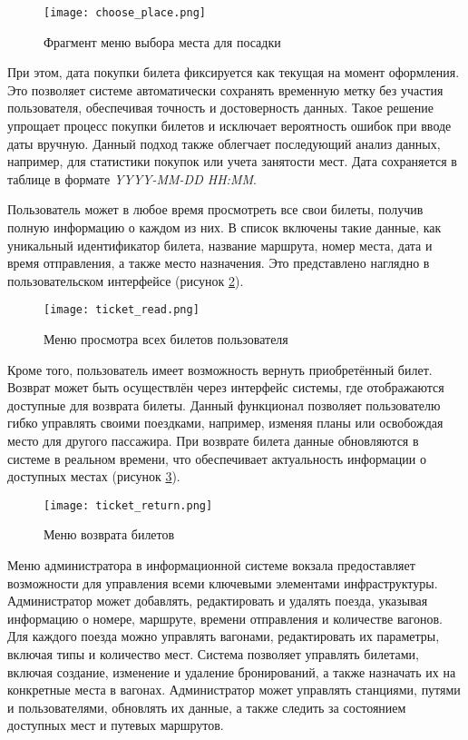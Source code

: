 \begin{figure}[h]
    \centering
    \texttt{[image: choose\_place.png]}
    \caption{Фрагмент меню выбора места для посадки}
    \label{fig:choose_place.png}
\end{figure}

При этом, дата покупки билета фиксируется как текущая на момент оформления. Это позволяет системе автоматически сохранять временную метку без участия пользователя, обеспечивая точность и достоверность данных. Такое решение упрощает процесс покупки билетов и исключает вероятность ошибок при вводе даты вручную. Данный подход также облегчает последующий анализ данных, например, для статистики покупок или учета занятости мест. Дата сохраняется в таблице в формате \textit{YYYY-MM-DD HH:MM}.

Пользователь может в любое время просмотреть все свои билеты, получив полную информацию о каждом из них. В список включены такие данные, как уникальный идентификатор билета, название маршрута, номер места, дата и время отправления, а также место назначения. Это представлено наглядно в пользовательском интерфейсе (рисунок \ref{fig:read_tickets.png}).

\begin{figure}[h]
    \centering
    \texttt{[image: ticket\_read.png]}
    \caption{Меню просмотра всех билетов пользователя}
    \label{fig:read_tickets.png}
\end{figure}

Кроме того, пользователь имеет возможность вернуть приобретённый билет. Возврат может быть осуществлён через интерфейс системы, где отображаются доступные для возврата билеты. Данный функционал позволяет пользователю гибко управлять своими поездками, например, изменяя планы или освобождая место для другого пассажира. При возврате билета данные обновляются в системе в реальном времени, что обеспечивает актуальность информации о доступных местах (рисунок \ref{fig:ticket_return.png}). 

\begin{figure}[h]
    \centering
    \texttt{[image: ticket\_return.png]}
    \caption{Меню возврата билетов}
    \label{fig:ticket_return.png}
\end{figure}

Меню администратора в информационной системе вокзала предоставляет возможности для управления всеми ключевыми элементами инфраструктуры. Администратор может добавлять, редактировать и удалять поезда, указывая информацию о номере, маршруте, времени отправления и количестве вагонов. Для каждого поезда можно управлять вагонами, редактировать их параметры, включая типы и количество мест. Система позволяет управлять билетами, включая создание, изменение и удаление бронирований, а также назначать их на конкретные места в вагонах. Администратор может управлять станциями, путями и пользователями, обновлять их данные, а также следить за состоянием доступных мест и путевых маршрутов.

